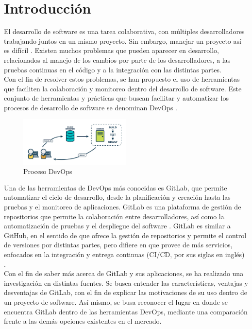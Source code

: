 \documentclass[runningheads]{llncs}
\begin{document}
\section{Introducción}
El desarrollo de software es una tarea colaborativa, con múltiples desarrolladores trabajando juntos en
un mismo proyecto. Sin embargo, manejar un proyecto así es difícil \cite{fairbanks2023analyzing}. Existen
muchos problemas que pueden aparecer en desarrollo, relacionados al manejo de los cambios por parte de los
desarrolladores, a las pruebas continuas en el código y a la integración con las distintas partes.\\
Con el fin de resolver estos problemas, se han propuesto el uso de herramientas que faciliten la colaboración
y monitoreo dentro del desarrollo de software. Este conjunto de herramientas y prácticas que buscan facilitar
y automatizar los procesos de desarrollo de software se denominan DevOps \cite{gitlab2022gitlab}.\\
\begin{figure}[htbp]
        \centering
        \includegraphics[width=0.5\textwidth]{Dev-Ops.png}
        \caption{Proceso DevOps}
        \label{fig:devops}
\end{figure}
Una de las herramientas de DevOps más conocidas es GitLab, que permite automatizar el ciclo de desarrollo,
desde la planificación y creación hasta las pruebas y el monitoreo de aplicaciones. GitLab es una plataforma
de gestión de repositorios que permite la colaboración entre desarrolladores, así como la automatización de
pruebas y el despliegue del software \cite{safari2020analysis}. GitLab es similar a GitHub, en el sentido de que
ofrece la gestión de repositorios y permite el control de versiones por distintas partes, pero difiere en
que provee de más servicios, enfocados en la integración y entrega continuas (CI/CD, por sus siglas en inglés) \cite{safari2020analysis}.\\
Con el fin de saber más acerca de GitLab y sus aplicaciones, se ha realizado una investigación en
distintas fuentes. Se busca entender las características, ventajas y desventajas de GitLab, con el fin
de explicar las motivaciones de su uso dentro de un proyecto de software. Así mismo, se busa reconocer el
lugar en donde se encuentra GitLab dentro de las herramientas DevOps, mediante una comparación frente a las demás
opciones existentes en el mercado.
\end{document}
